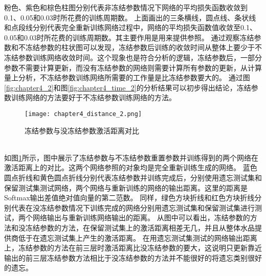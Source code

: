 粉色、紫色和棕色柱图分别代表非冻结参数情况下网络的平均损失函数收敛到0.1、0.05和0.03时所花费的训练周期数。
上面画出的三条横线，圆点线、条状线和点段线分别代表完全重新训练网络过程中，网络的平均损失函数值收敛至0.1、0.05和0.03时所花费的训练周期数。其主要作用是用来提供参照。
通过观察冻结参数和不冻结参数的柱状图可以发现，冻结参数后训练的收敛时间从整体上要少于不冻结参数训练网络收敛时间。这个现象也是符合分析的逻辑，冻结参数后，一部分参数不需要计算更新，而没有冻结参数的网络则需要计算所有参数的更新，从计算量上分析，不冻结参数训练网络所需要的工作量是比冻结参数要大的。
通过图\ref{fig:chapter4_2}和图\ref{fig:chapter4_time_2}的分析结果可以初步得出结论，冻结参数训练网络的方法要好于不冻结参数训练网络的方法。
\begin{figure}
    \centering
    \texttt{[image: chapter4\_distance\_2.png]}
    \caption{冻结参数与没冻结参数激活距离对比}
    \label{fig:chapter4_distance_2}
\end{figure}
\\如图\ref{fig:chapter4_distance_2}所示，图中展示了冻结参数与不冻结参数重置参数并训练得到的两个网络在激活距离上的对比。这两个网络参照的对象均是完全重新训练生成的网络。
蓝色圆点折线和黄色圆点折线分别代表冻结参数并训练完成后，分别使用遗忘测试集和保留测试集测试网络，两个网络与重新训练的网络的输出距离。这里的距离是Softmax输出差值绝对值向量的第二范数。
同样，绿色方块折线和红色方块折线分别代表在没冻结参数情况下训练完成的网络分别用遗忘测试集和保留测试集进行测试，两个网络输出与重新训练网络输出的距离。
从图中可以看出，冻结参数的方法和没冻结参数的方法，在保留测试集上的激活距离相差无几，并且从整体水品提供商低于在遗忘测试集上产生的激活距离。
在用遗忘测试集测试的网络输出距离上，冻结参数的方法在前三层时激活距离比没冻结参数的要大，这说明只更新靠近输出的前三层冻结参数方法相比于没冻结参数的方法并不能很好的将遗忘类别很好的遗忘。

